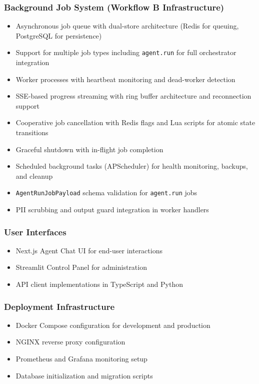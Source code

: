 \documentclass[a4paper,twoside]{sapthesis}
\begin{document}
\subsubsection{Background Job System (Workflow B Infrastructure)}

\begin{itemize}
    \item Asynchronous job queue with dual-store architecture (Redis for queuing, PostgreSQL for persistence)
    \item Support for multiple job types including \texttt{agent.run} for full orchestrator integration
    \item Worker processes with heartbeat monitoring and dead-worker detection
    \item SSE-based progress streaming with ring buffer architecture and reconnection support
    \item Cooperative job cancellation with Redis flags and Lua scripts for atomic state transitions
    \item Graceful shutdown with in-flight job completion
    \item Scheduled background tasks (APScheduler) for health monitoring, backups, and cleanup
    \item \texttt{AgentRunJobPayload} schema validation for \texttt{agent.run} jobs
    \item PII scrubbing and output guard integration in worker handlers
\end{itemize}

\subsubsection{User Interfaces}

\begin{itemize}
    \item Next.js Agent Chat UI for end-user interactions
    \item Streamlit Control Panel for administration
    \item API client implementations in TypeScript and Python
\end{itemize}

\subsubsection{Deployment Infrastructure}

\begin{itemize}
    \item Docker Compose configuration for development and production
    \item NGINX reverse proxy configuration
    \item Prometheus and Grafana monitoring setup
    \item Database initialization and migration scripts
\end{itemize}
\end{document}
